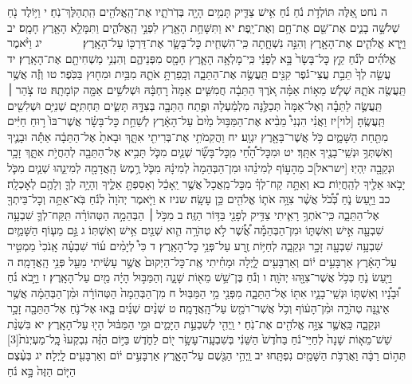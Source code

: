 \documentclass[twoside, openany, parskip=half, 11pt]{book}
\begin{document}
ה נֹחט אֵ֚לֶּה תּוֹלְדֹ֣ת נֹ֔חַ נֹ֗חַ אִ֥ישׁ צַדִּ֛יק תָּמִ֥ים הָיָ֖ה בְּדֹֽרֹתָ֑יו אֶת־הָֽאֱלֹהִ֖ים הִֽתְהַלֶּךְ־נֹֽחַ׃ י וַיּ֥וֹלֶד נֹ֖חַ שְׁלֹשָׁ֣ה בָנִ֑ים אֶת־שֵׁ֖ם אֶת־חָ֥ם וְאֶת־יָֽפֶת׃ יא וַתִּשָּׁחֵ֥ת הָאָ֖רֶץ לִפְנֵ֣י הָֽאֱלֹהִ֑ים וַתִּמָּלֵ֥א הָאָ֖רֶץ חָמָֽס׃ יב וַיַּ֧רְא אֱלֹהִ֛ים אֶת־הָאָ֖רֶץ וְהִנֵּ֣ה נִשְׁחָ֑תָה כִּֽי־הִשְׁחִ֧ית כׇּל־בָּשָׂ֛ר אֶת־דַּרְכּ֖וֹ עַל־הָאָֽרֶץ׃
　　　 יג וַיֹּ֨אמֶר אֱלֹהִ֜ים לְנֹ֗חַ קֵ֤ץ כׇּל־בָּשָׂר֙ בָּ֣א לְפָנַ֔י כִּֽי־מָלְאָ֥ה הָאָ֛רֶץ חָמָ֖ס מִפְּנֵיהֶ֑ם וְהִנְנִ֥י מַשְׁחִיתָ֖ם אֶת־הָאָֽרֶץ׃ יד עֲשֵׂ֤ה לְךָ֙ תֵּבַ֣ת עֲצֵי־גֹ֔פֶר קִנִּ֖ים תַּֽעֲשֶׂ֣ה אֶת־הַתֵּבָ֑ה וְכָֽפַרְתָּ֥ אֹתָ֛הּ מִבַּ֥יִת וּמִח֖וּץ בַּכֹּֽפֶר׃ טו וְזֶ֕ה אֲשֶׁ֥ר תַּֽעֲשֶׂ֖ה אֹתָ֑הּ שְׁלֹ֧שׁ מֵא֣וֹת אַמָּ֗ה אֹ֚רֶךְ הַתֵּבָ֔ה חֲמִשִּׁ֤ים אַמָּה֙ רׇחְבָּ֔הּ וּשְׁלֹשִׁ֥ים אַמָּ֖ה קוֹמָתָֽהּ׃ טז צֹ֣הַר ׀ תַּֽעֲשֶׂ֣ה לַתֵּבָ֗ה וְאֶל־אַמָּה֙ תְּכַלֶּ֣נָּה מִלְמַ֔עְלָה וּפֶ֥תַח הַתֵּבָ֖ה בְּצִדָּ֣הּ תָּשִׂ֑ים תַּחְתִּיִּ֛ם שְׁנִיִּ֥ם וּשְׁלִשִׁ֖ים תַּֽעֲשֶֽׂהָ׃ [לוי]יז וַאֲנִ֗י הִנְנִי֩ מֵבִ֨יא אֶת־הַמַּבּ֥וּל מַ֙יִם֙ עַל־הָאָ֔רֶץ לְשַׁחֵ֣ת כׇּל־בָּשָׂ֗ר אֲשֶׁר־בּוֹ֙ ר֣וּחַ חַיִּ֔ים מִתַּ֖חַת הַשָּׁמָ֑יִם כֹּ֥ל אֲשֶׁר־בָּאָ֖רֶץ יִגְוָֽע׃ יח וַהֲקִמֹתִ֥י אֶת־בְּרִיתִ֖י אִתָּ֑ךְ וּבָאתָ֙ אֶל־הַתֵּבָ֔ה אַתָּ֕ה וּבָנֶ֛יךָ וְאִשְׁתְּךָ֥ וּנְשֵֽׁי־בָנֶ֖יךָ אִתָּֽךְ׃ יט וּמִכׇּל־הָ֠חַ֠י מִֽכׇּל־בָּשָׂ֞ר שְׁנַ֧יִם מִכֹּ֛ל תָּבִ֥יא אֶל־הַתֵּבָ֖ה לְהַחֲיֹ֣ת אִתָּ֑ךְ זָכָ֥ר וּנְקֵבָ֖ה יִֽהְיֽוּ׃ [ישראל]כ מֵהָע֣וֹף לְמִינֵ֗הוּ וּמִן־הַבְּהֵמָה֙ לְמִינָ֔הּ מִכֹּ֛ל רֶ֥מֶשׂ הָֽאֲדָמָ֖ה לְמִינֵ֑הוּ שְׁנַ֧יִם מִכֹּ֛ל יָבֹ֥אוּ אֵלֶ֖יךָ לְהַֽחֲיֽוֹת׃ כא וְאַתָּ֣ה קַח־לְךָ֗ מִכׇּל־מַֽאֲכָל֙ אֲשֶׁ֣ר יֵֽאָכֵ֔ל וְאָסַפְתָּ֖ אֵלֶ֑יךָ וְהָיָ֥ה לְךָ֛ וְלָהֶ֖ם לְאׇכְלָֽה׃ כב וַיַּ֖עַשׂ נֹ֑חַ כְּ֠כֹ֠ל אֲשֶׁ֨ר צִוָּ֥ה אֹת֛וֹ אֱלֹהִ֖ים כֵּ֥ן עָשָֽׂה׃ שניז א וַיֹּ֤אמֶר יְהֹוָה֙ לְנֹ֔חַ בֹּֽא־אַתָּ֥ה וְכׇל־בֵּיתְךָ֖ אֶל־הַתֵּבָ֑ה כִּֽי־אֹתְךָ֥ רָאִ֛יתִי צַדִּ֥יק לְפָנַ֖י בַּדּ֥וֹר הַזֶּֽה׃ ב מִכֹּ֣ל ׀ הַבְּהֵמָ֣ה הַטְּהוֹרָ֗ה תִּֽקַּח־לְךָ֛ שִׁבְעָ֥ה שִׁבְעָ֖ה אִ֣ישׁ וְאִשְׁתּ֑וֹ וּמִן־הַבְּהֵמָ֡ה אֲ֠שֶׁ֠ר לֹ֣א טְהֹרָ֥ה הִ֛וא שְׁנַ֖יִם אִ֥ישׁ וְאִשְׁתּֽוֹ׃ ג גַּ֣ם מֵע֧וֹף הַשָּׁמַ֛יִם שִׁבְעָ֥ה שִׁבְעָ֖ה זָכָ֣ר וּנְקֵבָ֑ה לְחַיּ֥וֹת זֶ֖רַע עַל־פְּנֵ֥י כׇל־הָאָֽרֶץ׃ ד כִּי֩ לְיָמִ֨ים ע֜וֹד שִׁבְעָ֗ה אָֽנֹכִי֙ מַמְטִ֣יר עַל־הָאָ֔רֶץ אַרְבָּעִ֣ים י֔וֹם וְאַרְבָּעִ֖ים לָ֑יְלָה וּמָחִ֗יתִי אֶֽת־כׇּל־הַיְקוּם֙ אֲשֶׁ֣ר עָשִׂ֔יתִי מֵעַ֖ל פְּנֵ֥י הָֽאֲדָמָֽה׃ ה וַיַּ֖עַשׂ נֹ֑חַ כְּכֹ֥ל אֲשֶׁר־צִוָּ֖הוּ יְהֹוָֽה׃ ו וְנֹ֕חַ בֶּן־שֵׁ֥שׁ מֵא֖וֹת שָׁנָ֑ה וְהַמַּבּ֣וּל הָיָ֔ה מַ֖יִם עַל־הָאָֽרֶץ׃ ז וַיָּ֣בֹא נֹ֗חַ וּ֠בָנָ֠יו וְאִשְׁתּ֧וֹ וּנְשֵֽׁי־בָנָ֛יו אִתּ֖וֹ אֶל־הַתֵּבָ֑ה מִפְּנֵ֖י מֵ֥י הַמַּבּֽוּל׃ ח מִן־הַבְּהֵמָה֙ הַטְּהוֹרָ֔ה וּמִ֨ן־הַבְּהֵמָ֔ה אֲשֶׁ֥ר אֵינֶ֖נָּה טְהֹרָ֑ה וּמִ֨ן־הָע֔וֹף וְכֹ֥ל אֲשֶׁר־רֹמֵ֖שׂ עַל־הָֽאֲדָמָֽה׃ ט שְׁנַ֨יִם שְׁנַ֜יִם בָּ֧אוּ אֶל־נֹ֛חַ אֶל־הַתֵּבָ֖ה זָכָ֣ר וּנְקֵבָ֑ה כַּֽאֲשֶׁ֛ר צִוָּ֥ה אֱלֹהִ֖ים אֶת־נֹֽחַ׃ י וַֽיְהִ֖י לְשִׁבְעַ֣ת הַיָּמִ֑ים וּמֵ֣י הַמַּבּ֔וּל הָי֖וּ עַל־הָאָֽרֶץ׃ יא בִּשְׁנַ֨ת שֵׁשׁ־מֵא֤וֹת שָׁנָה֙ לְחַיֵּי־נֹ֔חַ בַּחֹ֙דֶשׁ֙ הַשֵּׁנִ֔י בְּשִׁבְעָֽה־עָשָׂ֥ר י֖וֹם לַחֹ֑דֶשׁ בַּיּ֣וֹם הַזֶּ֗ה נִבְקְעוּ֙ כׇּֽל־מַעְיְנֹת֙‏[3] תְּה֣וֹם רַבָּ֔ה וַאֲרֻבֹּ֥ת הַשָּׁמַ֖יִם נִפְתָּֽחוּ׃ יב וַֽיְהִ֥י הַגֶּ֖שֶׁם עַל־הָאָ֑רֶץ אַרְבָּעִ֣ים י֔וֹם וְאַרְבָּעִ֖ים לָֽיְלָה׃ יג בְּעֶ֨צֶם הַיּ֤וֹם הַזֶּה֙ בָּ֣א נֹ֔חַ 
\end{document}
